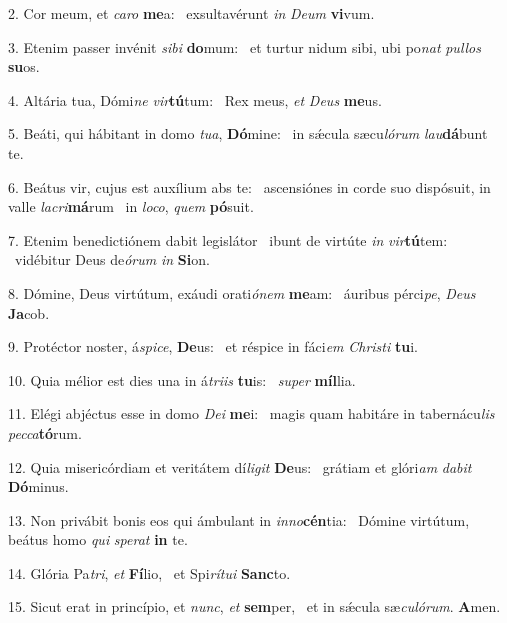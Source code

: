 2. Cor meum, et \textit{ca}\textit{ro} \textbf{me}a: \ast\  exsultavérunt \textit{in} \textit{De}\textit{um} \textbf{vi}vum.\

3. Etenim passer invénit \textit{si}\textit{bi} \textbf{do}mum: \ast\  et turtur nidum sibi, ubi po\textit{nat} \textit{pul}\textit{los} \textbf{su}os.\

4. Altária tua, Dómi\textit{ne} \textit{vir}\textbf{tú}tum: \ast\  Rex meus, \textit{et} \textit{De}\textit{us} \textbf{me}us.\

5. Beáti, qui hábitant in domo \textit{tu}\textit{a}, \textbf{Dó}mine: \ast\  in sǽcula sæcu\textit{ló}\textit{rum} \textit{lau}\textbf{dá}bunt te.\

6. Beátus vir, cujus est auxílium abs te: \dag\  ascensiónes in corde suo dispósuit, in valle \textit{la}\textit{cri}\textbf{má}rum \ast\  in \textit{lo}\textit{co}, \textit{quem} \textbf{pó}suit.\

7. Etenim benedictiónem dabit legislátor \dag\  ibunt de virtúte \textit{in} \textit{vir}\textbf{tú}tem: \ast\  vidébitur Deus de\textit{ó}\textit{rum} \textit{in} \textbf{Si}on.\

8. Dómine, Deus virtútum, exáudi orati\textit{ó}\textit{nem} \textbf{me}am: \ast\  áuribus pérci\textit{pe}, \textit{De}\textit{us} \textbf{Ja}cob.\

9. Protéctor noster, á\textit{spi}\textit{ce}, \textbf{De}us: \ast\  et réspice in fáci\textit{em} \textit{Chris}\textit{ti} \textbf{tu}i.\

10. Quia mélior est dies una in á\textit{tri}\textit{is} \textbf{tu}is: \ast\  \textit{su}\textit{per} \textbf{míl}lia.\

11. Elégi abjéctus esse in domo \textit{De}\textit{i} \textbf{me}i: \ast\  magis quam habitáre in tabernácu\textit{lis} \textit{pec}\textit{ca}\textbf{tó}rum.\

12. Quia misericórdiam et veritátem dí\textit{li}\textit{git} \textbf{De}us: \ast\  grátiam et glóri\textit{am} \textit{da}\textit{bit} \textbf{Dó}minus.\

13. Non privábit bonis eos qui ámbulant in \textit{in}\textit{no}\textbf{cén}tia: \ast\  Dómine virtútum, beátus homo \textit{qui} \textit{spe}\textit{rat} \textbf{in} te.\

14. Glória Pa\textit{tri}, \textit{et} \textbf{Fí}lio, \ast\  et Spi\textit{rí}\textit{tu}\textit{i} \textbf{Sanc}to.\

15. Sicut erat in princípio, et \textit{nunc}, \textit{et} \textbf{sem}per, \ast\  et in sǽcula sæ\textit{cu}\textit{ló}\textit{rum}. \textbf{A}men.\

